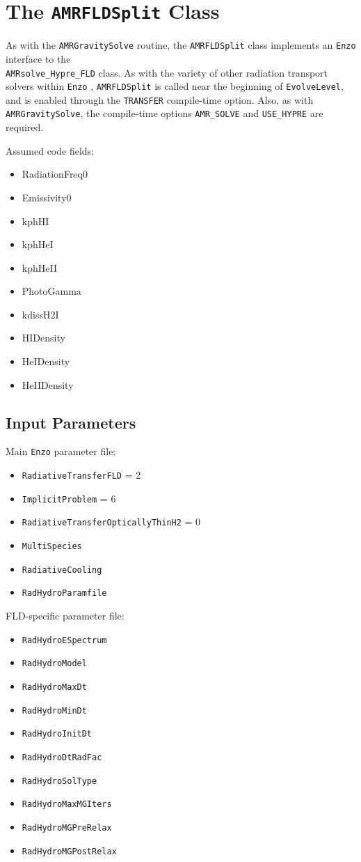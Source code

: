 \documentclass[letterpaper,10pt]{article}
\renewcommand{\(}{\left(}
\renewcommand{\)}{\right)}
\newcommand{\enzo}{{\tt Enzo} }
\begin{document}
\section{The {\tt AMRFLDSplit} Class}
\label{sec:AMRFLDSplit}

As with the {\tt AMRGravitySolve} routine, the {\tt AMRFLDSplit}
class implements an \enzo interface to the \\
{\tt AMRsolve\_Hypre\_FLD} class.  As with the variety of other
radiation transport solvers within \enzo, {\tt AMRFLDSplit} is called
near the beginning of {\tt EvolveLevel}, and is enabled through the
{\tt TRANSFER} compile-time option.  Also, as with 
{\tt AMRGravitySolve}, the compile-time options {\tt AMR\_SOLVE} and
{\tt USE\_HYPRE} are required.

Assumed code fields:
\begin{itemize}
\item RadiationFreq0
\item Emissivity0
\item kphHI
\item kphHeI
\item kphHeII
\item PhotoGamma
\item kdissH2I
\item HIDensity
\item HeIDensity
\item HeIIDensity
\end{itemize}




\subsection{Input Parameters}
\label{sec:AMRFLDSplit_parameters}

Main \enzo parameter file:
\begin{itemize}
\item {\tt RadiativeTransferFLD} = 2
\item {\tt ImplicitProblem} = 6
\item {\tt RadiativeTransferOpticallyThinH2} = 0
\item {\tt MultiSpecies}
\item {\tt RadiativeCooling}
\item {\tt RadHydroParamfile}
\end{itemize}

FLD-specific parameter file:
\begin{itemize}
\item {\tt RadHydroESpectrum}
\item {\tt RadHydroModel}
\item {\tt RadHydroMaxDt}
\item {\tt RadHydroMinDt}
\item {\tt RadHydroInitDt}
\item {\tt RadHydroDtRadFac}
\item {\tt RadHydroSolType}
\item {\tt RadHydroMaxMGIters}
\item {\tt RadHydroMGPreRelax}
\item {\tt RadHydroMGPostRelax}
\end{itemize}
\end{document}
